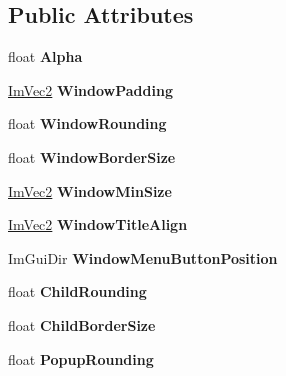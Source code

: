 \subsection*{Public Attributes}
\begin{DoxyCompactItemize}
\item 
\mbox{\label{structImGuiStyle_a993312606e9dcb7ca165245150a4da72}} 
float {\bfseries Alpha}
\item 
\mbox{\label{structImGuiStyle_a37f156b53e6dcc99ff57366ceafe8b50}} 
\hyperlink{structImVec2}{Im\+Vec2} {\bfseries Window\+Padding}
\item 
\mbox{\label{structImGuiStyle_acd902c2ab4b53d4bb0f64da608320894}} 
float {\bfseries Window\+Rounding}
\item 
\mbox{\label{structImGuiStyle_a4e2af4dd711f57ee841f9c843a18bec2}} 
float {\bfseries Window\+Border\+Size}
\item 
\mbox{\label{structImGuiStyle_a060b2f743a086d0f0fee4cd5b3f372d4}} 
\hyperlink{structImVec2}{Im\+Vec2} {\bfseries Window\+Min\+Size}
\item 
\mbox{\label{structImGuiStyle_a3fc57a15ab8f206045f1e5dfccd8b2e7}} 
\hyperlink{structImVec2}{Im\+Vec2} {\bfseries Window\+Title\+Align}
\item 
\mbox{\label{structImGuiStyle_ab67a3fe38a4c109fe9de03228fb2c172}} 
Im\+Gui\+Dir {\bfseries Window\+Menu\+Button\+Position}
\item 
\mbox{\label{structImGuiStyle_aba2b4c6be52366ce2ac06b7849cd5cb2}} 
float {\bfseries Child\+Rounding}
\item 
\mbox{\label{structImGuiStyle_a5dd4fc33733ac7171d88740eb777f2e3}} 
float {\bfseries Child\+Border\+Size}
\item 
\mbox{\label{structImGuiStyle_a44b39e666946eea00001b6e38ab6bdc7}} 
float {\bfseries Popup\+Rounding}
\item 
\mbox{\label{structImGuiStyle_ac3bc5e785e360f72b580d419953c9db4}} 

\end{DoxyCompactItemize}
